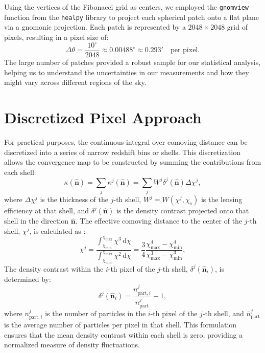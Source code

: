 Using the vertices of the Fibonacci grid as centers, we employed the \texttt{gnomview} function from the \texttt{healpy} library \citep{Zonca2019} to project each spherical patch onto a flat plane via a gnomonic projection. Each patch is represented by a $2048 \times 2048$ grid of pixels, resulting in a pixel size of:
\begin{equation}
    \Delta \theta = \frac{10^\circ}{2048} \approx 0.00488^\circ \approx 0.293' \quad \text{per pixel}.
\end{equation}
The large number of patches provided a robust sample for our statistical analysis, helping us to understand the uncertainties in our measurements and how they might vary across different regions of the sky.

\section{Discretized Pixel Approach}
For practical purposes, the continuous integral over comoving distance can be discretized into a series of narrow redshift bins or shells. This discretization allows the convergence map to be constructed by summing the contributions from each shell:
\begin{equation}
    \kappa(\hat{\boldsymbol{n}}) = \sum_j \kappa^j(\hat{\boldsymbol{n}}) = \sum_j W^j \delta^j(\hat{\boldsymbol{n}}) \Delta \chi^j,
\end{equation}
where $\Delta \chi^j$ is the thickness of the $j$-th shell, $W^j = W(\chi^j, \chi_s)$ is the lensing efficiency at that shell, and $\delta^j(\hat{\boldsymbol{n}})$ is the density contrast projected onto that shell in the direction $\hat{\boldsymbol{n}}$.
The effective comoving distance to the center of the $j$-th shell, $\chi^j$, is calculated as \citep{2015MNRAS.453.3043S}:
\begin{equation}
    \chi^j = \frac{\int_{\chi_{\min}}^{\chi_{\max}} \chi^3 \, \mathrm{d}\chi}{\int_{\chi_{\min}}^{\chi_{\max}} \chi^2 \, \mathrm{d}\chi} = \frac{3}{4} \frac{\chi_{\max}^4 - \chi_{\min}^4}{\chi_{\max}^3 - \chi_{\min}^3},
\end{equation}
The density contrast within the $i$-th pixel of the $j$-th shell, $\delta^j(\hat{\boldsymbol{n}}_i)$, is determined by:
\begin{equation}
    \delta^j(\hat{\boldsymbol{n}}_i) = \frac{n_{\mathrm{part}, i}^j}{\bar{n}_{\mathrm{part}}^j} - 1,
\end{equation}
where $n_{\mathrm{part}, i}^j$ is the number of particles in the $i$-th pixel of the $j$-th shell, and $\bar{n}_{\mathrm{part}}^j$ is the average number of particles per pixel in that shell. This formulation ensures that the mean density contrast within each shell is zero, providing a normalized measure of density fluctuations.

